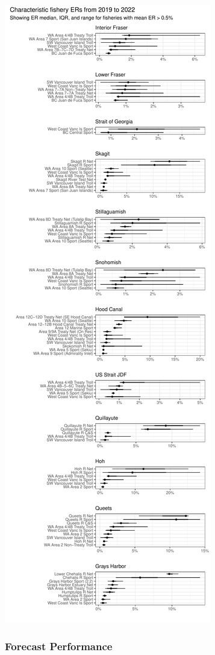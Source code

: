 \documentclass[
  letterpaper,
  DIV=11,
  numbers=noendperiod]{scrartcl}
\begin{document}
\includegraphics{index-5yr_files/figure-pdf/fishery_er_quantiles-1.pdf}

\subsubsection{Forecast Performance}\label{forecast-performance}
\end{document}
